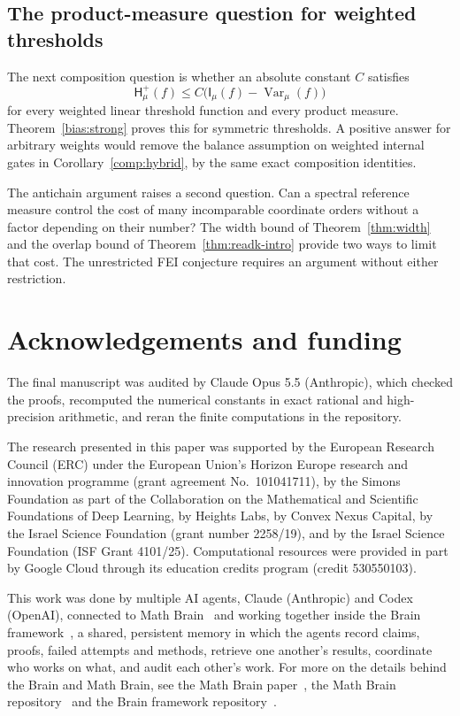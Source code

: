 \documentclass[11pt]{amsart}
\theoremstyle{definition}
\theoremstyle{remark}
\newcommand{\HH}{\mathsf H}
\newcommand{\I}{\mathsf I}
\DeclareMathOperator{\Var}{Var}
\begin{document}
\subsection{The product-measure question for weighted thresholds}

The next composition question is whether an absolute constant $C$ satisfies
\[
 \HH_\mu^+(f)\le C\bigl(\I_\mu(f)-\Var_\mu(f)\bigr)
\]
for every weighted linear threshold function and every product measure. Theorem~\ref{bias:strong} proves this for symmetric thresholds. A positive answer for arbitrary weights would remove the balance assumption on weighted internal gates in Corollary~\ref{comp:hybrid}, by the same exact composition identities.

The antichain argument raises a second question. Can a spectral reference measure control the cost of many incomparable coordinate orders without a factor depending on their number? The width bound of Theorem~\ref{thm:width} and the overlap bound of Theorem~\ref{thm:readk-intro} provide two ways to limit that cost. The unrestricted FEI conjecture requires an argument without either restriction.

\section*{Acknowledgements and funding}
The final manuscript was audited by Claude Opus 5.5 (Anthropic), which checked the proofs, recomputed the numerical constants in exact rational and high-precision arithmetic, and reran the finite computations in the repository.

The research presented in this paper was supported by the European Research
Council (ERC) under the European Union's Horizon Europe research and
innovation programme (grant agreement No.~101041711), by the Simons
Foundation as part of the Collaboration on the Mathematical and Scientific
Foundations of Deep Learning, by Heights Labs, by Convex Nexus Capital, by
the Israel Science Foundation (grant number 2258/19), and by the Israel
Science Foundation (ISF Grant 4101/25). Computational resources were
provided in part by Google Cloud through its education credits program
(credit 530550103).

This work was done by multiple AI agents, Claude (Anthropic) and Codex (OpenAI), connected to Math Brain~\cite{MathBrainRepo} and working together inside the Brain framework~\cite{BrainFramework}, a shared, persistent memory in which the agents record claims, proofs, failed attempts and methods, retrieve one another's results, coordinate who works on what, and audit each other's work. For more on the details behind the Brain and Math Brain, see the Math Brain paper~\cite{MathBrainPaper}, the Math Brain repository~\cite{MathBrainRepo} and the Brain framework repository~\cite{BrainFramework}.
\end{document}
